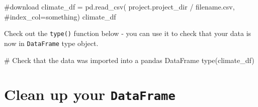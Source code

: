 \documentclass[
  letterpaper,
  DIV=11,
  numbers=noendperiod,
  oneside]{scrreprt}
\newenvironment{Shaded}{\begin{snugshade}}{\end{snugshade}}
\newcommand{\BuiltInTok}[1]{\textcolor[rgb]{0.00,0.23,0.31}{#1}}
\newcommand{\CommentTok}[1]{\textcolor[rgb]{0.37,0.37,0.37}{#1}}
\newcommand{\NormalTok}[1]{\textcolor[rgb]{0.00,0.23,0.31}{#1}}
\newcommand{\OperatorTok}[1]{\textcolor[rgb]{0.37,0.37,0.37}{#1}}
\newcommand{\StringTok}[1]{\textcolor[rgb]{0.13,0.47,0.30}{#1}}
\begin{document}
\begin{Shaded}
\begin{Highlighting}[]
\CommentTok{\#download}
\NormalTok{climate\_df }\OperatorTok{=}\NormalTok{ pd.read\_csv(}
\NormalTok{    project.project\_dir }\OperatorTok{/} \StringTok{\textquotesingle{}filename.csv\textquotesingle{}}\NormalTok{,}
    \CommentTok{\#index\_col=\textquotesingle{}something\textquotesingle{})}
\NormalTok{climate\_df}
\end{Highlighting}
\end{Shaded}

\begin{tcolorbox}[enhanced jigsaw, colbacktitle=quarto-callout-tip-color!10!white, opacityback=0, bottomtitle=1mm, toptitle=1mm, bottomrule=.15mm, left=2mm, colframe=quarto-callout-tip-color-frame, leftrule=.75mm, opacitybacktitle=0.6, colback=white, rightrule=.15mm, toprule=.15mm, breakable, titlerule=0mm, title=\textcolor{quarto-callout-tip-color}{\faLightbulb}\hspace{0.5em}{Tip}, coltitle=black, arc=.35mm]

Check out the \texttt{type()} function below - you can use it to check
that your data is now in \texttt{DataFrame} type object.

\end{tcolorbox}

\begin{Shaded}
\begin{Highlighting}[]
\CommentTok{\# Check that the data was imported into a pandas DataFrame}
\BuiltInTok{type}\NormalTok{(climate\_df)}
\end{Highlighting}
\end{Shaded}

\section{\texorpdfstring{Clean up your
\texttt{DataFrame}}{Clean up your DataFrame}}\label{clean-up-your-dataframe-1}
\end{document}
